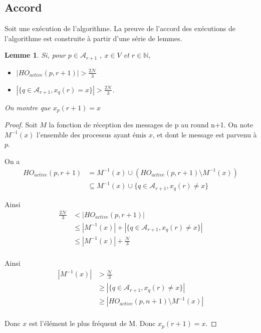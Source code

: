 \documentclass{article}
\newtheorem{lemma}{Lemme}
\begin{document}
\subsection{Accord}

Soit une exécution de l'algorithme.
La preuve de l'accord des exécutions de l'algorithme est construite à partir d'une série de lemmes.

\begin{lemma}

	Si, pour $p \in \mathcal{A}_{r+1}$ , $x \in V$ et $r \in \mathds{N}$, 

\begin{itemize}

	\item $| HO_{active} (p,r+1) | > \frac{2\mathcal{N}}{3}$
	\item $| \{ q \in \mathcal{A}_{r+1} , x_q(r) = x \} | > \frac{2\mathcal{N}}{3}$.

\end{itemize}

On montre que $x_p(r+1) = x$

\end{lemma}

\begin{proof}

	Soit $M$ la fonction de réception des messages de p au round n+1. On note $M^{-1}(x)$ l'ensemble des processus ayant émis $x$, et dont le message est parvenu à $p$.

	On a
\begin{equation}
\begin{split}
	HO_{active}(p, r+1) & = M^{-1}(x) \cup (HO_{active}(p, r+1) \setminus M^{-1}(x)) \\
	& \subseteq M^{-1}(x) \cup \{ q \in \mathcal{A}_{r+1} , x_q(r) \neq x \}
\end{split}
\end{equation}

Ainsi 
\begin{equation}
\begin{split}
\frac{2\mathcal{N}}{3} & < | HO_{active}(p, r+1) | \\
		& \leq | M^{-1}(x) | + | \{ q \in \mathcal{A}_{r+1} , x_q(r) \neq x \} | \\
		& \leq | M^{-1}(x) | +  \frac{\mathcal{N}}{3} \\
\end{split}
\end{equation}


	Ainsi
\begin{equation}
\begin{split}
| M^{-1}(x) | & > \frac{\mathcal{N}}{3} \\
		& \geq | \{ q \in \mathcal{A}_{r+1} , x_q(r) \neq x \} | \\
		& \geq | HO_{active}(p,n+1) \setminus M^{-1}(x) | \\
\end{split}
\end{equation}

Donc $x$ est l'élément le plus fréquent de M. Donc $x_p(r+1) = x$.

\end{proof}
\end{document}
